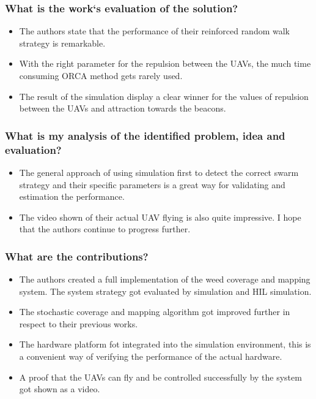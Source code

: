 \subsubsection*{What is the work`s evaluation of the solution?}
\begin{itemize}
    \item The authors state that the performance of their reinforced random walk strategy is remarkable.
    \item With the right parameter for the repulsion between the UAVs, the much time consuming ORCA method gets rarely used.
    \item The result of the simulation display a clear winner for the values of repulsion between the UAVs and attraction towards the beacons. 
\end{itemize}
\subsubsection*{What is my analysis of the identified problem, idea and evaluation?}
\begin{itemize}
    \item The general approach of using simulation first to detect the correct swarm strategy and their specific parameters is a great way for validating and estimation the performance.
    \item The video shown of their actual UAV flying is also quite impressive.  I hope that the authors continue to progress further.
\end{itemize}
\subsubsection*{What are the contributions?}
\begin{itemize}
    \item The authors created a full implementation of the weed coverage and mapping system. The system strategy got evaluated by simulation and HIL simulation.
    \item The stochastic coverage and mapping algorithm got improved further in respect to their previous works.
    \item The hardware platform fot integrated into the simulation environment, this is a convenient way of verifying the performance of the actual hardware.
    \item A proof that the UAVs can fly and be controlled successfully by the system got shown as a video.
\end{itemize}
